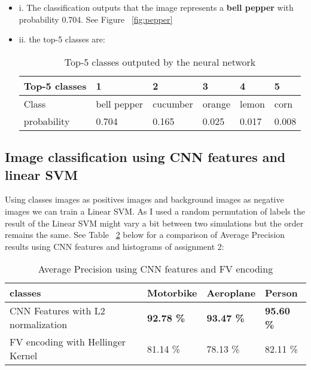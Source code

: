 \documentclass{article}
\begin{document}
\begin{itemize}
\item i. The classification outputs that the image represents a \textbf{bell pepper} with probability \textbf{}0.704. See Figure ~\ref{fig:pepper}


\item ii. the top-5 classes are:

\begin{table}[H]
\centering
\begin{tabular}{|l|l|l|l|l|l|}
\hline
\textbf{Top-5 classes} & 1 & 2 & 3 & 4 & 5 \\ \hline
Class & bell pepper & cucumber & orange & lemon & corn \\ \hline
probability & 0.704 & 0.165 & 0.025 & 0.017 & 0.008 \\ \hline
\end{tabular}
\caption{Top-5 classes outputed by the neural network}
\label{table:top5}
\end{table}

\end{itemize}


\subsection{Image classification using CNN features and linear SVM}

Using classes images as positives images and background images as negative images we can train a Linear SVM. As I used a random permutation of labels the result of the Linear SVM might vary a bit between two simulations but the order remains the same. See Table ~\ref{table:comparison_cnn_sift} below for a comparison of Average Precision results using CNN features and histograms of assignment 2:

\begin{table}[H]
\centering
\begin{tabular}{|l|l|l|l|}
\hline
\textbf{classes} & Motorbike & Aeroplane & Person \\ \hline
CNN Features with L2 normalization & \textbf{92.78 \%} & \textbf{93.47 \%} & \textbf{95.60 \%} \\ \hline
FV encoding with Hellinger Kernel & 81.14 \% & 78.13 \% & 82.11 \% \\ \hline
\end{tabular}
\caption{Average Precision using CNN features and FV encoding}
\label{table:comparison_cnn_sift}
\end{table}
\end{document}
